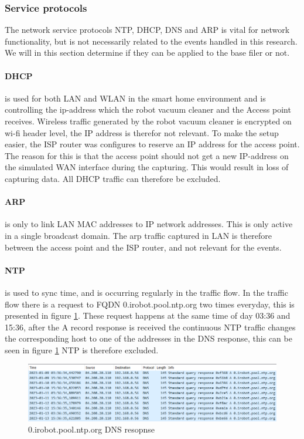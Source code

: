 \subsubsection{Service protocols}
The network service protocols NTP, DHCP, DNS and ARP is vital for network functionality, but is not necessarily related to the events handled in this research. We will in this section determine if they can be applied to the base filer or not. 

\paragraph{DHCP} is used for both LAN and WLAN in the smart home environment and is controlling the ip-address which the robot vacuum cleaner and the Access point receives. Wireless traffic generated by the robot vacuum cleaner is encrypted on wi-fi header level, the IP address is therefor not relevant. To make the setup easier, the ISP router was configures to reserve an IP address for the access point. The reason for this is that the access point should not get a new IP-address on the simulated WAN interface during the capturing. This would result in loss of capturing data. All DHCP traffic can therefore be excluded.

\paragraph{ARP} is only to link LAN MAC addresses to IP network addresses. This is only active in a single broadcast domain. The arp traffic captured in LAN is therefore between the access point and the ISP router, and not relevant for the events. 

\paragraph{NTP} is used to sync time, and is occurring regularly in the traffic flow. In the traffic flow there is a request to FQDN 0.irobot.pool.ntp.org two times everyday, this is presented in figure \ref{fig:ntp_dns}. These request happens at the same time of day 03:36 and 15:36, after the A record response is received the continuous NTP traffic changes the corresponding host to one of the addresses in the DNS response, this can be seen in figure \ref{fig:ntp_dns} NTP is therefore excluded.

\begin{figure}[H]
    \centering
    \includegraphics[width=\textwidth]{figures/NTP_wireshark .png}
    \caption{0.irobot.pool.ntp.org DNS resopnse}
    \label{fig:ntp_dns}
\end{figure}

